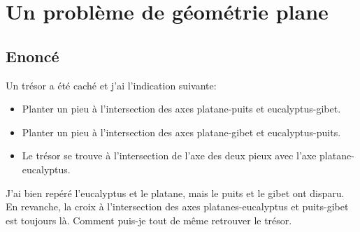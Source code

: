 \documentclass{article}
\newenvironment{statement}{\subsection{Enoncé}}{\pagebreak}
\begin{document}
\section{Un problème de géométrie plane}
\begin{statement}
Un trésor a été caché et j'ai l'indication suivante:
\begin{itemize}
\item
Planter un pieu à l'intersection des axes platane-puits et eucalyptus-gibet.
\item
Planter un pieu à l'intersection des axes platane-gibet et eucalyptus-puits.
\item
Le trésor se trouve à l'intersection de l'axe des deux pieux avec l'axe platane-eucalyptus.
\end{itemize}
J'ai bien repéré l'eucalyptus et le platane, mais le puits et le gibet ont disparu. En revanche, la croix à l'intersection des axes platanes-eucalyptus et puits-gibet est toujours là. Comment puis-je tout de même retrouver le trésor.
\end{statement}
\end{document}
